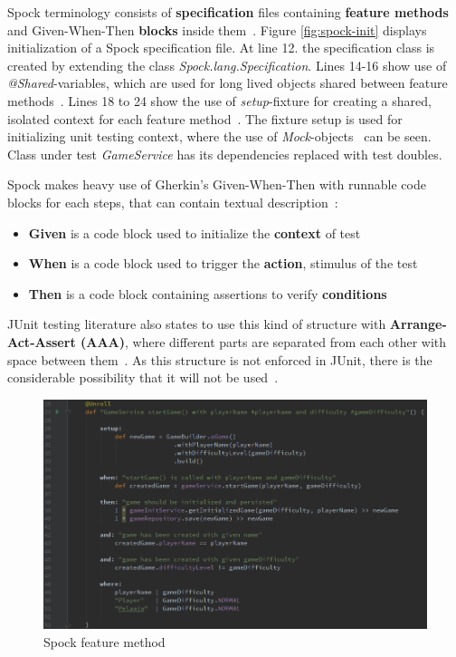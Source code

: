     Spock terminology consists of \textbf{specification} files containing \textbf{feature methods} and Given-When-Then
    \textbf{blocks} inside them~\cite{spock}. Figure \ref{fig:spock-init} displays initialization of a Spock specification
    file. At line 12. the specification class is created by extending the class \textit{Spock.lang.Specification}. Lines
    14-16 show use of \textit{@Shared}-variables, which are used for long lived objects shared between feature methods~\cite{spock}.
    Lines 18 to 24 show the use of \textit{setup}-fixture for creating a shared, isolated context for each feature method~\cite{spock}.
    The fixture setup is used for initializing unit testing context, where the use of \textit{Mock}-objects~\cite{spock} can be seen.
    Class under test \textit{GameService} has its dependencies replaced with test doubles.

    Spock makes heavy use of Gherkin's Given-When-Then with runnable code blocks for each steps, that can contain textual
    description~\cite{kapelonis2016java}:
    \begin{itemize}
    \item \textbf{Given} is a code block used to initialize the \textbf{context} of test
    \item \textbf{When} is a code block used to trigger the \textbf{action}, stimulus of the test
    \item \textbf{Then} is a code block containing assertions to verify \textbf{conditions}
    \end{itemize}
    JUnit testing literature also states to use this kind of structure with \textbf{Arrange-Act-Assert (AAA)},
    where different parts are separated from each other with space between them~\cite{langr2015pragmatic}.
    As this structure is not enforced in JUnit, there is the considerable possibility that it will not be used~\cite{kapelonis2016java}.
    \begin{figure}[ht]
      \begin{center}
        \includegraphics[width=13.7cm]{images/spock-example.png}
        \caption{Spock feature method}
        \label{fig:spock-example}
      \end{center}
    \end{figure}

